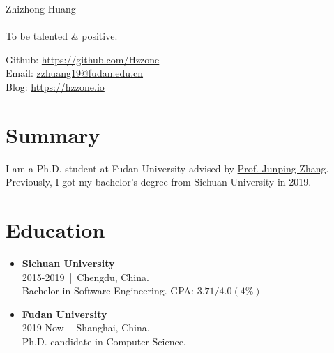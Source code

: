 \documentclass{article}
\begin{document}
    \pagestyle{empty}  %
    \thispagestyle{empty} %
    \begin{multicols}{2}
        \begin{flushleft}
            \huge
            Zhizhong Huang \\
            \small
            \quad\\
            To be talented \& positive.
        \end{flushleft}
        \vfill\columnbreak
        \small
        \begin{flushright}
            Github: \url{https://github.com/Hzzone} \\
            Email: \url{zzhuang19@fudan.edu.cn} \\
            Blog: \url{https://hzzone.io}
        \end{flushright}
    \end{multicols}
    \section*{Summary}
    I am a Ph.D. student at Fudan University advised by \href{http://www.pami.fudan.edu.cn/~jpzhang/}{Prof. Junping Zhang}. Previously, I got my bachelor's degree from Sichuan University in 2019.
    \section*{Education}
        \begin{itemize}[leftmargin=*]
            \item \begin{flushleft} \textbf{Sichuan University} \\ 2015-2019~|~Chengdu, China.\\ Bachelor in Software Engineering. GPA: $3.71/4.0(4\%)$        \end{flushleft}
            \item \begin{flushleft} \textbf{Fudan University} \\ 2019-Now | Shanghai, China.\\ Ph.D. candidate in Computer Science.\end{flushleft}
        \end{itemize}
\end{document}
